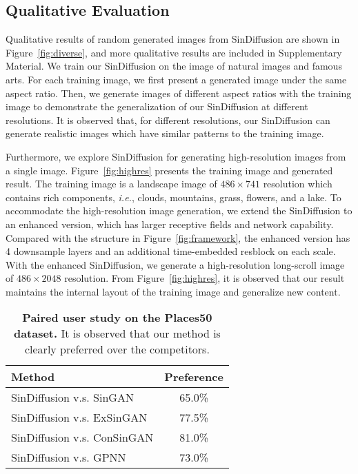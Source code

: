 \documentclass[10pt,twocolumn,letterpaper]{article}
\begin{document}
\subsection{Qualitative Evaluation}
Qualitative results of random generated images from SinDiffusion are shown in Figure~\ref{fig:diverse}, and more qualitative results are included in Supplementary Material.
We train our SinDiffusion on the image of natural images and famous arts.
For each training image, we first present a generated image under the same aspect ratio.
Then, we generate images of different aspect ratios with the training image to demonstrate the generalization of our SinDiffusion at different resolutions.
It is observed that, for different resolutions, our SinDiffusion can generate realistic images which have similar patterns to the training image. 

Furthermore, we explore SinDiffusion for generating high-resolution images from a single image.
Figure~\ref{fig:highres} presents the training image and generated result.
The training image is a landscape image of $486 \times 741$ resolution which contains rich components, \emph{i.e.}, clouds, mountains, grass, flowers, and a lake.
To accommodate the high-resolution image generation, we extend the SinDiffusion to an enhanced version, which has larger receptive fields and network capability.
Compared with the structure in Figure~\ref{fig:framework}, the enhanced version has 4 downsample layers and an additional time-embedded resblock on each scale.
With the enhanced SinDiffusion, we generate a high-resolution long-scroll image of $486 \times 2048$ resolution.
From Figure~\ref{fig:highres}, it is observed that our result maintains the internal layout of the training image and generalize new content.

\begin{table}[t]
    \footnotesize
    \centering
    \begin{tabular}{l @{\hskip 30mm} c}
    \toprule
    \textbf{Method} & \textbf{Preference} \\
    \midrule
    {SinDiffusion v.s. SinGAN} & 65.0\% \\
    {SinDiffusion v.s. ExSinGAN} & 77.5\% \\
    {SinDiffusion v.s. ConSinGAN} & 81.0\% \\
    {SinDiffusion v.s. GPNN} & 73.0\% \\
    \bottomrule
    \end{tabular}
    \vspace{-3mm}
    \caption{\textbf{Paired user study on the Places50 dataset.}
    It is observed that our method is clearly preferred over the competitors.}
    \vspace{-6mm}
    \label{tab:userstudy}
\end{table}
\end{document}
